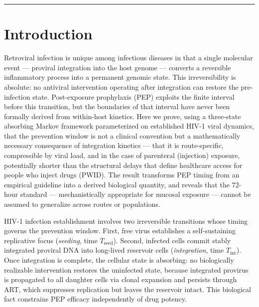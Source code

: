 \documentclass[11pt]{article}
\theoremstyle{definition}
\theoremstyle{remark}
\newcommand{\Tseed}{T_{\text{seed}}}
\newcommand{\Tint}{T_{\text{int}}}
\begin{document}
\vspace{1em}
\hrule
\vspace{1em}

\section*{Introduction}

Retroviral infection is unique among infectious diseases in that a single molecular event --- proviral integration into the host genome --- converts a reversible inflammatory process into a permanent genomic state. This irreversibility is absolute: no antiviral intervention operating after integration can restore the pre-infection state. Post-exposure prophylaxis (PEP) exploits the finite interval before this transition, but the boundaries of that interval have never been formally derived from within-host kinetics. Here we prove, using a three-state absorbing Markov framework parameterized on established HIV-1 viral dynamics\cite{tanner2025,chun1995,siliciano2005}, that the prevention window is not a clinical convention but a mathematically necessary consequence of integration kinetics --- that it is route-specific, compressible by viral load, and in the case of parenteral (injection) exposure, potentially shorter than the structural delays that define healthcare access for people who inject drugs (PWID). The result transforms PEP timing from an empirical guideline into a derived biological quantity, and reveals that the 72-hour standard --- mechanistically appropriate for mucosal exposure --- cannot be assumed to generalize across routes or populations.

HIV-1 infection establishment involves two irreversible transitions whose timing governs the prevention window. First, free virus establishes a self-sustaining replicative focus (\emph{seeding}, time $\Tseed$). Second, infected cells commit stably integrated proviral DNA into long-lived reservoir cells (\emph{integration}, time $\Tint$). Once integration is complete, the cellular state is absorbing: no biologically realizable intervention restores the uninfected state, because integrated provirus is propagated to all daughter cells via clonal expansion\cite{chun1995,siliciano2005} and persists through ART, which suppresses replication but leaves the reservoir intact\cite{perelson1997}. This biological fact constrains PEP efficacy independently of drug potency.

\end{document}
